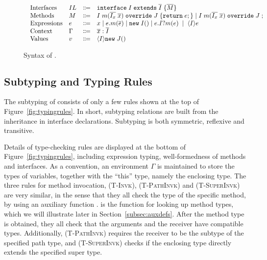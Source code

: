 \begin{figure*}[t]
\saveSpaceFig
\begin{displaymath}
\begin{array}{l}
\begin{array}{llrl}
\text{Interfaces}   & IL & \Coloneqq & \texttt{interface} \; I \; \texttt{extends} \; \overline{I} \; {\{} \overline{M} {\}} \\
\text{Methods}      & M  & \Coloneqq & I \; m (\overline{I_x} \; \overline{x}) \; \texttt{override} \; J \; {\{} \texttt{return} \; e ; {\}}  \mid
									   I \; m (\overline{I_x} \; \overline{x}) \; \texttt{override} \; J \; ; \\
\text{Expressions}  & e  & \Coloneqq & x \mid
e.m(\overline{e}) \mid
\texttt{new} \; I() \mid
e.I?m(e) \; \mid \; \langle I \rangle e \\
\text{Context}      & \Gamma & \Coloneqq & \overline{x}:\overline{I} \\
\text{Values}       & v & \Coloneqq & \langle I \rangle \texttt{new} \; J() \\
\end{array}
\end{array}
\end{displaymath}
\caption{Syntax of \name{}.}\label{fig:syntax}
\saveSpaceFig
\end{figure*}

\subsection{Subtyping and Typing Rules}
The subtyping of \MIM{} consists of only a few rules shown at the top of Figure~\ref{fig:typingrules}.
In short, subtyping relations are built from the inheritance in interface
declarations. Subtyping is both symmetric, reflexive and transitive.

Details of type-checking rules are displayed at the bottom of Figure~\ref{fig:typingrules}, including expression
typing, well-formedness of methods and interfaces. As a convention, an environment
$\Gamma$ is maintained to store the types of variables, together with
the ``this'' type, namely
the enclosing type. The three rules for method invocation, \textsc{(T-Invk)}, \textsc{(T-PathInvk)} and \textsc{(T-SuperInvk)}
are very similar, in the sense that they all check the type of the specific method, by using
an auxiliary function \mtype. \mtype{} is the function for looking up method types, which we will
illustrate later in Section~\ref{subsec:auxdefs}. After the method
type is obtained, they all check that the arguments and the receiver
have compatible types. Additionally, \textsc{(T-PathInvk)} requires the receiver to be the subtype of the specified
path type, and \textsc{(T-SuperInvk)} checks if the enclosing type directly extends the specified super type.

